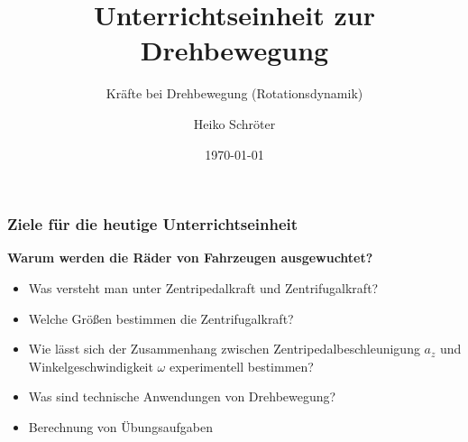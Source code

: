 \documentclass{beamer}
\title{Unterrichtseinheit zur Drehbewegung}
\subtitle{Kräfte bei Drehbewegung (Rotationsdynamik)}
\author{Heiko Schröter}
\date{\today}
\begin{document}
\frame{\titlepage}

\frame
{
  \frametitle{Ziele für die heutige Unterrichtseinheit}
  \textbf{Warum werden die Räder von Fahrzeugen ausgewuchtet?}
  \begin{itemize}
	\item Was versteht man unter Zentripedalkraft und Zentrifugalkraft?
	\item Welche Größen bestimmen die Zentrifugalkraft?
	\item Wie lässt sich der Zusammenhang zwischen Zentripedalbeschleunigung $a_z$ und Winkelgeschwindigkeit $\omega$ experimentell bestimmen?
	\item Was sind technische Anwendungen von Drehbewegung?
	\item Berechnung von Übungsaufgaben
  \end{itemize}
}
\end{document}
